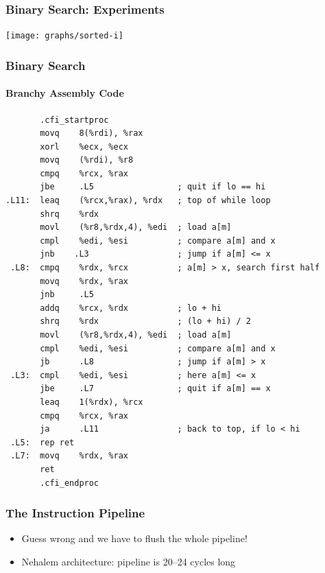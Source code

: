 \documentclass[xcolor=dvipsnames]{beamer}
\newcommand{\mi}[1]{\multiinclude[<+>][start=1,format=pdf]{#1}}
\begin{document}
\begin{frame}
  \frametitle{Binary Search: Experiments}
  \begin{center}
    \texttt{[image: graphs/sorted-i]}
  \end{center}
\end{frame}

\begin{frame}[fragile]
  \frametitle{Binary Search}
  \framesubtitle{Branchy Assembly Code}

\tiny
\begin{verbatim}
       .cfi_startproc
       movq    8(%rdi), %rax
       xorl    %ecx, %ecx
       movq    (%rdi), %r8
       cmpq    %rcx, %rax
       jbe     .L5                 ; quit if lo == hi
.L11:  leaq    (%rcx,%rax), %rdx   ; top of while loop
       shrq    %rdx
       movl    (%r8,%rdx,4), %edi  ; load a[m]
       cmpl    %edi, %esi          ; compare a[m] and x
       jnb    .L3                  ; jump if a[m] <= x
 .L8:  cmpq    %rdx, %rcx          ; a[m] > x, search first half
       movq    %rdx, %rax
       jnb     .L5
       addq    %rcx, %rdx          ; lo + hi
       shrq    %rdx                ; (lo + hi) / 2
       movl    (%r8,%rdx,4), %edi  ; load a[m]
       cmpl    %edi, %esi          ; compare a[m] and x
       jb      .L8                 ; jump if a[m] > x
 .L3:  cmpl    %edi, %esi          ; here a[m] <= x
       jbe     .L7                 ; quit if a[m] == x
       leaq    1(%rdx), %rcx
       cmpq    %rcx, %rax
       ja      .L11                ; back to top, if lo < hi
 .L5:  rep ret
 .L7:  movq    %rdx, %rax
       ret
       .cfi_endproc
\end{verbatim}

\end{frame}

\begin{frame}
   \frametitle{The Instruction Pipeline}

   \begin{center}
      \mi{figs/pipeline}
   \end{center}
   \vspace{-1em}
   \begin{itemize}
     \item<3->Guess wrong and we have to flush the whole pipeline!
     \item<4->Nehalem architecture: pipeline is 20--24 cycles long
   \end{itemize}
\end{frame}
\end{document}
